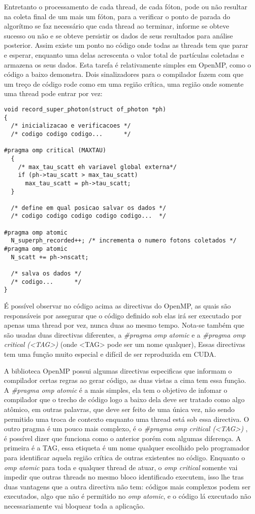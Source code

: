     Entretanto o processamento de cada thread, de cada fóton, pode ou não resultar na coleta final de um mais um fóton, para a verificar o ponto de parada do algorítmo se faz necessário que cada thread ao terminar, informe se obteve sucesso ou não e se obteve persistir os dados de seus resultados para análise posterior. Assim existe um ponto no código onde todas as threads tem que parar e esperar, enquanto uma delas acrescenta o valor total de partículas coletadas e armazena os seus dados. Esta tarefa é relativamente simples em OpenMP, como o código a baixo demonstra. Dois sinalizadores para o compilador fazem com que um treço de código rode como em uma região crítica, uma região onde somente uma thread pode entrar por vez:

    \begin{lstlisting}
void record_super_photon(struct of_photon *ph)
{
  /* inicializacao e verificacoes */
  /* codigo codigo codigo...      */

#pragma omp critical (MAXTAU)
  {
    /* max_tau_scatt eh variavel global externa*/
    if (ph->tau_scatt > max_tau_scatt)
      max_tau_scatt = ph->tau_scatt;
  }

  /* define em qual posicao salvar os dados */
  /* codigo codigo codigo codigo codigo...  */

#pragma omp atomic
  N_superph_recorded++; /* incrementa o numero fotons coletados */
#pragma omp atomic
  N_scatt += ph->nscatt;

  /* salva os dados */
  /* codigo...      */
}
    \end{lstlisting}

    É possível observar no código acima as directivas do OpenMP, as quais são responsáveis por assegurar que o código definido sob elas irá ser executado por apenas uma thread por vez, nunca duas ao mesmo tempo. Nota-se também que são usadas duas directivas diferentes, a \textit{\#pragma omp atomic} e a \textit{\#pragma omp critical (<TAG>) } (onde <TAG> pode ser um nome qualquer), Essas directivas tem uma função muito especial e difícil de ser reproduzida em CUDA.

    A biblioteca OpenMP possui algumas directivas especificas que informam o compilador certas regras ao gerar código, as duas vistas a cima tem essa função. A \textit{\#pragma omp atomic} é a mais simples, ela tem o objetivo de infomar o compilador que o trecho de código logo a baixo dela deve ser tratado como algo atômico, em outras palavras, que deve ser feito de uma única vez, não sendo permitido uma troca de contexto enquanto uma thread está sob essa directiva. O outro pragma é um pouco mais complexo, é o \textit{\#pragma omp critical (<TAG>) }, é possível  dizer que funciona como o anterior porém com algumas diferença. A primeira é a TAG, essa etiqueta é um nome qualquer escolhido pelo programador para identificar aquela região crítica de outras existentes no código. Enquanto o \textit{omp atomic} para toda e qualquer thread de atuar, o \textit{omp critical} somente vai impedir que outras threads no mesmo bloco identificado executem, isso lhe tras duas vantagens que a outra directiva não tem: códigos mais complexos podem ser executados, algo que não é permitido no \textit{omp atomic}, e o código lá executado não necessariamente vai bloquear toda a aplicação.

